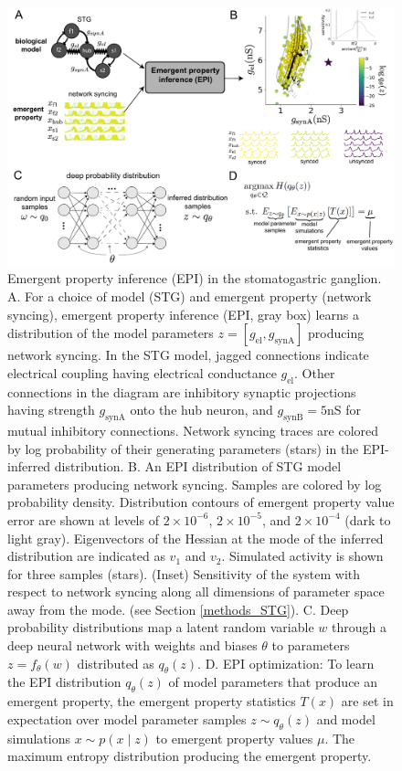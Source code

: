 \documentclass[11pt]{article}
\begin{document}
\begin{figure}
\begin{center}
\includegraphics[scale=0.35]{figures/fig1/fig1.pdf}
\end{center}
\caption{Emergent property inference (EPI) in the stomatogastric ganglion.  A. For a choice of model (STG) and emergent property (network syncing), emergent property inference (EPI, gray box) learns a distribution of the model parameters $z = \left[g_{\text{el}}, g_{\text{synA}} \right]$ producing network syncing.  In the STG model, jagged connections indicate electrical coupling having electrical conductance $g_{\text{el}}$. Other connections in the diagram are inhibitory synaptic projections having strength $g_{\text{synA}}$ onto the hub neuron, and $g_{\text{synB}}=5$nS for mutual inhibitory connections.  Network syncing traces are colored by log probability of their generating parameters (stars) in the EPI-inferred distribution.  B. An EPI distribution of STG model parameters producing network syncing.  Samples are colored by log probability density.  Distribution contours of emergent property value error are shown at levels of $2 \times 10^{-6}$, $2 \times 10^{-5}$, and $2 \times 10^{-4}$ (dark to light gray).  Eigenvectors of the Hessian at the mode of the inferred distribution are indicated as $v_1$ and $v_2$.  Simulated activity is shown for three samples (stars). (Inset) Sensitivity of the system with respect to network syncing along all dimensions of parameter space away from the mode. (see Section \ref{methods_STG}).  C. Deep probability distributions map a latent random variable $w$ through a deep neural network with weights and biases $\theta$ to parameters $z = f_\theta(w)$ distributed as $q_\theta(z)$. D. EPI optimization: To learn the EPI distribution $q_\theta(z)$ of model parameters that produce an emergent property, the emergent property statistics $T(x)$ are set in expectation over model parameter samples $z \sim q_\theta(z)$ and model simulations $x \sim p(x \mid z)$ to emergent property values $\mu$. The maximum entropy distribution producing the emergent property. }
 \label{fig:STG}
\end{figure}
\end{document}
